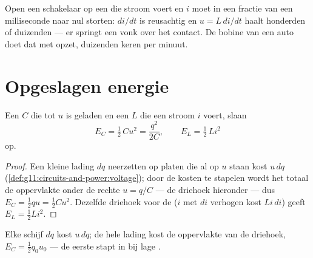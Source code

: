 \begin{remark}\label{rem:g12:rc-rl-circuits:spark}
Open een schakelaar op een  die stroom voert en $i$ moet in een fractie
van een milliseconde naar nul storten: $di/dt$ is reusachtig en
$u = L\,di/dt$ haalt honderden of duizenden  --- er springt een vonk over
het contact. De bobine van een auto doet dat met opzet, duizenden keren per
minuut.
\end{remark}

\section{Opgeslagen energie}

\begin{proposition}\label{prop:g12:rc-rl-circuits:energy}
Een  $C$ die tot  $u$ is geladen en een  $L$ die een
stroom $i$ voert, slaan
\[
E_C = \tfrac12\,C u^2 = \frac{q^2}{2C},
\qquad
E_L = \tfrac12\,L i^2
\]
op.
\end{proposition}

\begin{proof}
Een kleine lading $dq$ neerzetten op platen die al op  $u$ staan kost
$u\,dq$ (\cref{def:g11:circuits-and-power:voltage}); door de kosten te
stapelen wordt het totaal de oppervlakte onder de rechte $u = q/C$ --- de
driehoek hieronder --- dus $E_C = \tfrac12 qu = \tfrac12 Cu^2$. Dezelfde
driehoek voor de  ($i$ met $di$ verhogen kost $Li\,di$) geeft
$E_L = \tfrac12 Li^2$.
\end{proof}

\begin{omfigure}

{\small Elke schijf $dq$ kost $u\,dq$; de hele lading kost de oppervlakte van
de driehoek, $E_C = \tfrac12 q_0 u_0$ --- de eerste  stapt in bij lage
.}
\end{omfigure}

